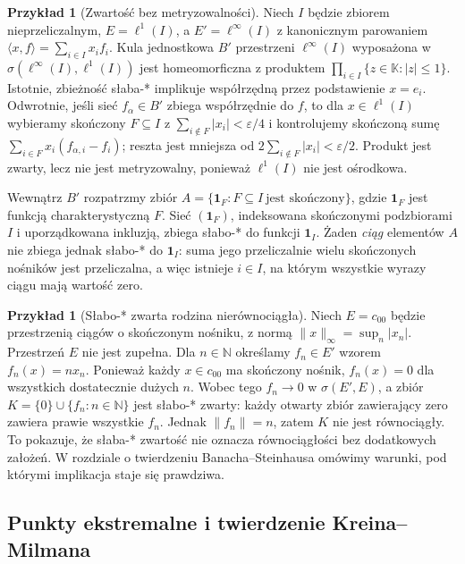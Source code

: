 \documentclass[11pt,a4paper]{article}
\numberwithin{equation}{section}
\theoremstyle{plain}
\theoremstyle{definition}
\newtheorem{przyklad}[twierdzenie]{Przykład}
\theoremstyle{remark}
\newcommand{\N}{\mathbb N}
\newcommand{\K}{\mathbb K}
\begin{document}
\begin{przyklad}[Zwartość bez metryzowalności]\label{ex:uncountable-product}
Niech $I$ będzie zbiorem nieprzeliczalnym,
$E=\ell^1(I)$, a $E'=\ell^\infty(I)$ z kanonicznym parowaniem
$\langle x,f\rangle=\sum_{i\in I}x_i f_i$.
Kula jednostkowa $B'$ przestrzeni $\ell^\infty(I)$
wyposażona w $\sigma(\ell^\infty(I),\ell^1(I))$
jest homeomorficzna z produktem
$\prod_{i\in I}\{z\in\K:|z|\le1\}$.
Istotnie, zbieżność słaba-* implikuje współrzędną przez
podstawienie $x=e_i$. Odwrotnie, jeśli sieć $f_\alpha\in B'$
zbiega współrzędnie do $f$, to dla $x\in\ell^1(I)$
wybieramy skończony $F\subseteq I$ z
$\sum_{i\notin F}|x_i|<\varepsilon/4$ i kontrolujemy
skończoną sumę $\sum_{i\in F}x_i(f_{\alpha,i}-f_i)$;
reszta jest mniejsza od $2\sum_{i\notin F}|x_i|<\varepsilon/2$.
Produkt jest zwarty, lecz nie jest metryzowalny, ponieważ
$\ell^1(I)$ nie jest ośrodkowa.

Wewnątrz $B'$ rozpatrzmy zbiór
$A=\{\mathbf 1_F:F\subseteq I\ \text{jest skończony}\}$,
gdzie $\mathbf 1_F$ jest funkcją charakterystyczną $F$.
Sieć $(\mathbf 1_F)$, indeksowana skończonymi podzbiorami $I$
i uporządkowana inkluzją, zbiega słabo-* do funkcji
$\mathbf 1_I$. Żaden \emph{ciąg} elementów $A$ nie zbiega
jednak słabo-* do $\mathbf 1_I$: suma jego przeliczalnie wielu
skończonych nośników jest przeliczalna, a więc istnieje
$i\in I$, na którym wszystkie wyrazy ciągu mają wartość zero.
\end{przyklad}

\begin{przyklad}[Słabo-* zwarta rodzina nierównociągła]
\label{ex:compact-not-equicont}
Niech $E=c_{00}$ będzie przestrzenią ciągów o skończonym nośniku,
z normą $\|x\|_\infty=\sup_n|x_n|$. Przestrzeń $E$ nie jest
zupełna. Dla $n\in\N$ określamy $f_n\in E'$ wzorem
$f_n(x)=n x_n$. Ponieważ każdy $x\in c_{00}$ ma skończony
nośnik, $f_n(x)=0$ dla wszystkich dostatecznie dużych $n$.
Wobec tego $f_n\to0$ w $\sigma(E',E)$, a zbiór
$K=\{0\}\cup\{f_n:n\in\N\}$ jest słabo-* zwarty:
każdy otwarty zbiór zawierający zero zawiera prawie wszystkie $f_n$.
Jednak $\|f_n\|=n$, zatem $K$ nie jest równociągły.
To pokazuje, że słaba-* zwartość nie oznacza równociągłości
bez dodatkowych założeń. W rozdziale o twierdzeniu
Banacha--Steinhausa omówimy warunki, pod którymi implikacja
staje się prawdziwa.
\end{przyklad}

\subsection{Punkty ekstremalne i twierdzenie Kreina--Milmana}
\label{subsec:krein-milman}
\end{document}
